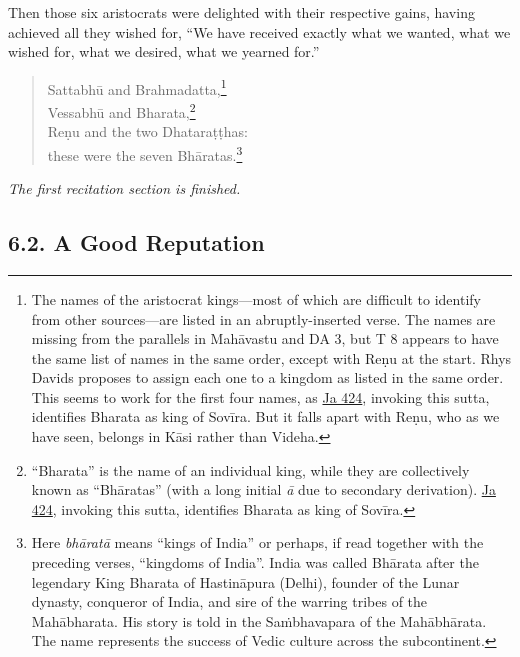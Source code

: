 \documentclass[12pt,openany]{book}%
\newcommand*{\scendsection}[1]{\begin{Center}\begin{small}\textit{#1}\end{small}\end{Center}\addvspace{1em}}
\begin{document}
\begin{verse}
%
\end{verse}

Then those six aristocrats were delighted with their respective gains, having achieved all they wished for, “We have received exactly what we wanted, what we wished for, what we desired, what we yearned for.” 

\begin{verse}%
\textsanskrit{Sattabhū} and Brahmadatta,\footnote{The names of the aristocrat kings—most of which are difficult to identify from other sources—are listed in an abruptly-inserted verse. The names are missing from the parallels in \textsanskrit{Mahāvastu} and DA 3, but T 8 appears to have the same list of names in the same order, except with \textsanskrit{Reṇu} at the start. Rhys Davids proposes to assign each one to a kingdom as listed in the same order. This seems to work for the first four names, as \href{https://suttacentral.net/ja424/en/sujato}{Ja 424}, invoking this sutta, identifies Bharata as king of \textsanskrit{Sovīra}. But it falls apart with \textsanskrit{Reṇu}, who as we have seen, belongs in \textsanskrit{Kāsi} rather than Videha. } \\
\textsanskrit{Vessabhū} and Bharata,\footnote{“Bharata” is the name of an individual king, while they are collectively known as “\textsanskrit{Bhāratas}” (with a long initial \textit{\textsanskrit{ā}} due to secondary derivation). \href{https://suttacentral.net/ja424/en/sujato}{Ja 424}, invoking this sutta, identifies Bharata as king of \textsanskrit{Sovīra}. } \\
\textsanskrit{Reṇu} and the two \textsanskrit{Dhataraṭṭhas}: \\
these were the seven \textsanskrit{Bhāratas}.\footnote{Here \textit{\textsanskrit{bhāratā}} means “kings of India” or perhaps, if read together with the preceding verses, “kingdoms of India”. India was called \textsanskrit{Bhārata} after the legendary King Bharata of \textsanskrit{Hastināpura} (Delhi), founder of the Lunar dynasty, conqueror of India, and sire of the warring tribes of the \textsanskrit{Mahābharata}. His story is told in the \textsanskrit{Saṁbhavapara} of the \textsanskrit{Mahābhārata}. The name represents the success of Vedic culture across the subcontinent. } 

%
\end{verse}

\scendsection{The first recitation section is finished. }

\subsection*{6.2. A Good Reputation }
\end{document}
